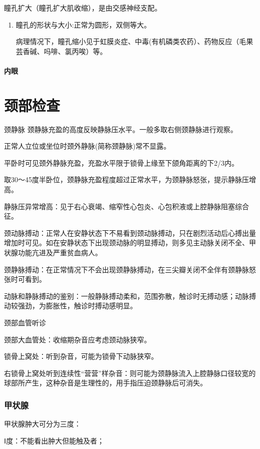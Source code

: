 \documentclass[UTF8]{ctexbook}
\begin{document}
瞳孔扩大（瞳孔扩大肌收缩），是由交感神经支配。
\begin{enumerate}[(1)]
    \item 瞳孔的形状与大小:正常为圆形，双侧等大。

          病理情况下，瞳孔缩小见于虹膜炎症、中毒(有机磷类农药）、药物反应（毛果芸香碱、吗啡、氯丙唉）等。
\end{enumerate}
\subsubsection{内眼}

\chapter{颈部检查}

颈静脉  颈静脉充盈的高度反映静脉压水平。一般多取右侧颈静脉进行观察。

正常人立位或坐位时颈外静脉(简称颈静脉)常不显露。

平卧时可见颈外静脉充盈，充盈水平限于锁骨上缘至下颌角距离的下2/3内。

取30～45度半卧位，颈静脉充盈程度超过正常水平，为颈静脉怒张，提示静脉压增高。

静脉压异常增高：见于右心衰竭、缩窄性心包炎、心包积液或上腔静脉阻塞综合征。


颈动脉搏动：正常人在安静状态下不易看到颈动脉搏动，只在剧烈活动后心搏出量增加时可见。如在安静状态下出现颈动脉的明显搏动，则多见主动脉关闭不全、甲状腺功能亢进及严重贫血病人。

颈静脉搏动：在正常情况下不会出现颈静脉搏动，在三尖瓣关闭不全伴有颈静脉怒张时可看到。

动脉和静脉搏动的鉴别：一般静脉搏动柔和，范围弥散，触诊时无搏动感；动脉搏动较强劲，为膨胀性，触诊时搏动感明显。

颈部血管听诊

颈部大血管处：收缩期杂音应考虑颈动脉狭窄。

锁骨上窝处：听到杂音，可能为锁骨下动脉狭窄。

右锁骨上窝处听到连续性“营营”样杂音：则可能为颈静脉流入上腔静脉口径较宽的球部所产生，这种杂音是生理性的，用手指压迫颈静脉后可消失。

\subsection{甲状腺}

甲状腺肿大可分为三度：

Ⅰ度：不能看出肿大但能触及者；
\end{document}
